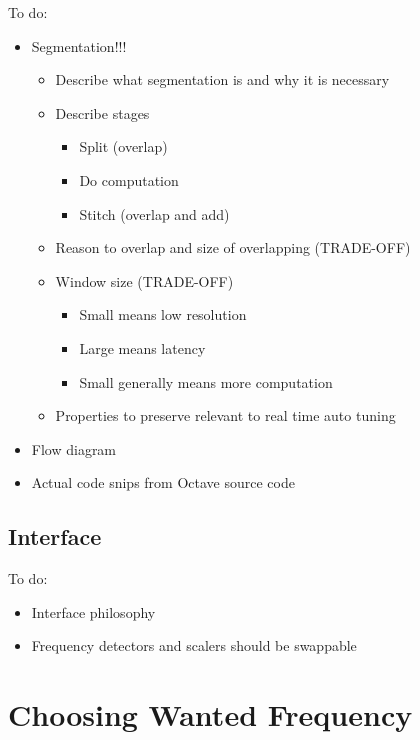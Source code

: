 \color{red}
To do:
\begin{itemize}
	\item Segmentation!!!
	\begin{itemize}
		\item Describe what segmentation is and why it is necessary
		\item Describe stages
		\begin{itemize}
			\item Split (overlap)
			\item Do computation
			\item Stitch (overlap and add)
		\end{itemize}
		\item Reason to overlap and size of overlapping (TRADE-OFF)
		\item Window size (TRADE-OFF)
		\begin{itemize}
			\item Small means low resolution
			\item Large means latency
			\item Small generally means more computation
		\end{itemize}
		\item Properties to preserve relevant to real time auto tuning
	\end{itemize}
	\item Flow diagram
	\item Actual code snips from Octave source code
\end{itemize}
\color{black}

\subsection{Interface}

\color{red}
To do:
\begin{itemize}
	\item Interface philosophy
	\item Frequency detectors and scalers should be swappable
\end{itemize}
\color{black}

\section{Choosing Wanted Frequency}

